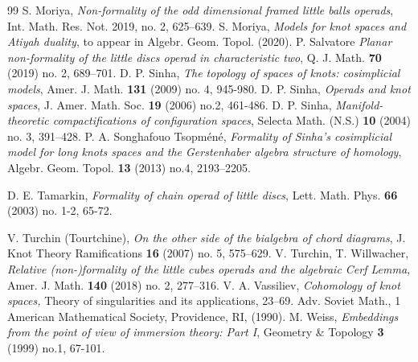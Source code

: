 \documentclass[reqno]{amsart}
\theoremstyle{definition}
\theoremstyle{plain}
\newcommand{\ZZ}{\mathbb{Z}}%
\begin{document}
\begin{thebibliography}{99}
S. Moriya, {\em Non-formality of the odd dimensional framed little balls operads}, Int. Math. Res. Not.  2019, no. 2, 625–639.
S. Moriya, {\em Models for knot spaces and Atiyah duality}, to appear in Algebr. Geom. Topol. (2020).
 P. Salvatore {\em Planar non-formality of the little discs operad in characteristic two}, Q. J. Math. {\bf 70} (2019) no. 2, 689–701.
 D. P.  Sinha, 
{\em The topology of spaces of knots: cosimplicial models}, 
Amer. J. Math.  {\bf 131}  (2009)  no. 4, 945-980. 
 D. P. Sinha, {\em Operads and knot spaces}, J.  Amer. Math. Soc. {\bf 19} (2006) no.2, 461-486.
 D. P. Sinha, {\em Manifold-theoretic compactifications of configuration spaces}, 
Selecta Math. (N.S.)  {\bf 10}  (2004)  no. 3, 391–428. 
P. A. Songhafouo Tsopm\'en\'e, 
{\em Formality of Sinha's cosimplicial model for long knots spaces and the Gerstenhaber algebra structure of homology}, Algebr. Geom. Topol. {\bf 13} (2013) no.4, 2193–2205.

D. E. Tamarkin, {\em Formality of chain operad of little discs}, Lett. Math. Phys. {\bf 66} (2003) no. 1-2, 65-72.

 V. Turchin (Tourtchine), {\em On the other side of the bialgebra of chord diagrams}, J. Knot Theory Ramifications {\bf 16} (2007) no. 5, 575–629.
 V. Turchin,  T. Willwacher, {\em Relative (non-)formality of the little cubes operads and the algebraic Cerf Lemma,} Amer. J. Math. {\bf 140} (2018) no. 2, 277–316.
V. A. Vassiliev, 
{\em Cohomology of knot spaces,} Theory of singularities and its applications, 23–69.
Adv. Soviet Math., 1
American Mathematical Society, Providence, RI, (1990).
  M. Weiss, {\em Embeddings from the point of view of immersion theory: Part I}, Geometry \& Topology {\bf 3} (1999) no.1, 67-101.


\end{thebibliography}
\end{document}
